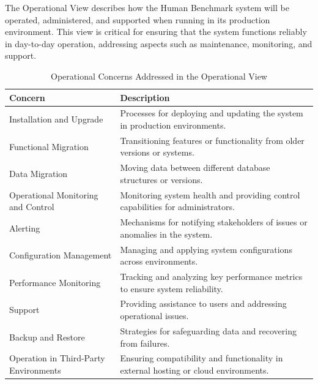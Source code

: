 The Operational View describes how the Human Benchmark system will be operated,
administered, and supported when running in its production environment. This
view is critical for ensuring that the system functions reliably in day-to-day
operation, addressing aspects such as maintenance, monitoring, and
support.
\begin{table}[H]
    \centering
    \caption{Operational Concerns Addressed in the Operational View}
    \label{tab:operational_concerns}
    \begin{tabular}{|p{}|p{}|}
        \hline
        \textbf{Concern}                     & \textbf{Description}                                                                 \\ \hline
        Installation and Upgrade             & Processes for deploying and updating the system in production environments.          \\ \hline
        Functional Migration                 & Transitioning features or functionality from older versions or systems.              \\ \hline
        Data Migration                       & Moving data between different database structures or versions.                       \\ \hline
        Operational Monitoring and Control   & Monitoring system health and providing control capabilities for administrators.      \\ \hline
        Alerting                             & Mechanisms for notifying stakeholders of issues or anomalies in the system.          \\ \hline
        Configuration Management             & Managing and applying system configurations across environments.                     \\ \hline
        Performance Monitoring               & Tracking and analyzing key performance metrics to ensure system reliability.         \\ \hline
        Support                              & Providing assistance to users and addressing operational issues.                     \\ \hline
        Backup and Restore                   & Strategies for safeguarding data and recovering from failures.                       \\ \hline
        Operation in Third-Party Environments & Ensuring compatibility and functionality in external hosting or cloud environments.  \\ \hline
    \end{tabular}
\end{table}

